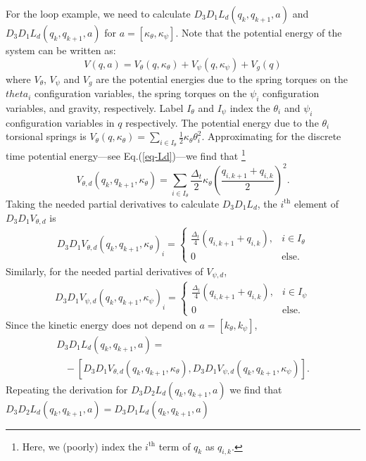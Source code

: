\documentclass[letterpaper, 10pt, conference]{ieeeconf}
\begin{document}
For the loop example, we need to calculate $D_3D_1L_d(q_k,q_{k+1},a)$ and $D_3D_1L_d(q_k,q_{k+1},a)$ for $a = [\kappa_\theta, \kappa_\psi]$.  Note that the potential energy of the system can be written as:
\[
V(q,a) = V_{\theta}(q,\kappa_{\theta}) + V_{\psi}(q,\kappa_{\psi}) + V_g(q)
\]
where $V_{\theta}$, $V_{\psi}$ and $V_g$ are the potential energies due to the spring torques on the $theta_i$ configuration variables, the spring torques on the $\psi_i$ configuration variables, and gravity, respectively.  Label $I_\theta$ and $I_\psi$ index the $\theta_i$ and $\psi_i$ configuration variables in $q$ respectively. The potential energy due to the $\theta_i$ torsional springs is $V_{\theta}(q, \kappa_{\theta}) = \sum_{i\in I_\theta}\frac{1}{2}\kappa_{\theta}\theta_i^2$.  Approximating for the discrete time potential energy---see Eq.(\ref{eq-Ld})---we find that \footnote{Here, we (poorly) index the $i^\textrm{th}$ term of $q_k$ as $q_{i,k}$.}
\[
V_{\theta,d}(q_k,q_{k+1},\kappa_{\theta}) = \sum_{i \in I_\theta}\frac{\Delta_t}{2}\kappa_{\theta}(\frac{q_{i,k+1} + q_{i,k}}{2})^2.
\]
Taking the needed partial derivatives to calculate $D_3D_1L_d$, the $i^\textrm{th}$ element of $D_3D_1V_{\theta,d}$ is
\[
\begin{array}{l}
D_3D_1 V_{\theta,d}(q_k,q_{k+1},\kappa_{\theta})_i 
= \left\{\begin{array}{ll}
\frac{\Delta_t}{4}(q_{i,k+1} + q_{i,k}),   &     i\in I_\theta \\
0 & \textrm{else}.
\end{array}\right.
\end{array}
\]
Similarly, for the needed partial derivatives of $V_{\psi,d}$,
\[
\begin{array}{l}
D_3D_1 V_{\psi,d}(q_k,q_{k+1},\kappa_{\psi})_i 
= \left\{\begin{array}{ll}
\frac{\Delta_t}{4}(q_{i,k+1} + q_{i,k}),   &     i\in I_\psi \\
0 & \textrm{else}.
\end{array}\right.
\end{array}
\] 
Since the kinetic energy does not depend on $a = [k_\theta, k_\psi]$,
\[
\begin{array}{l}
D_3D_1L_d(q_k,q_{k+1},a) = \\\hspace{10pt}- [D_3D_1 V_{\theta,d}(q_k,q_{k+1},\kappa_{\theta}), D_3D_1 V_{\psi,d}(q_k,q_{k+1},\kappa_{\psi})].
\end{array}
\]
Repeating the derivation for $D_3D_2L_d(q_k,q_{k+1},a)$ we find that $D_3D_2L_d(q_k,q_{k+1},a) = D_3D_1L_d(q_k,q_{k+1},a)$
\end{document}
